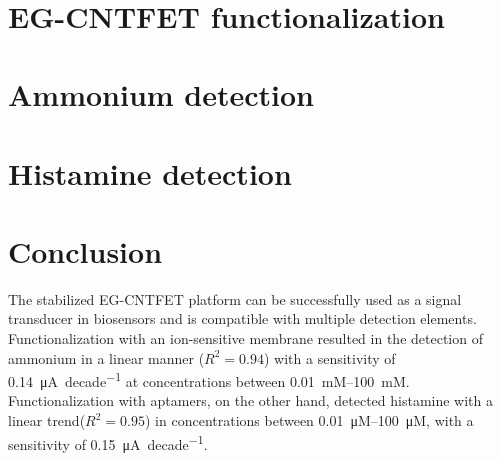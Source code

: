 \newpage
\thispagestyle{empty}
\ %
\newpage


\section{EG-CNTFET functionalization}
\label{sec:EGFETfunctionalization}




\section{Ammonium detection}
\label{sec:ammonium}




\section{Histamine detection}
\label{sec:histamine}




\section{Conclusion}

The stabilized EG-CNTFET platform can be successfully used as a signal transducer in biosensors and is compatible with multiple detection elements. Functionalization with an ion-sensitive membrane resulted in the detection of ammonium in a linear manner ($R^2=0.94$) with a sensitivity of \SI{0.14}{\uA \per decade} at concentrations between \SIrange{0.01}{100}{mM}.
Functionalization with aptamers, on the other hand, detected histamine with a linear trend($R^2=0.95$) in concentrations between \SIrange{0.01}{100}{\micro M}, with a sensitivity of \SI{0.15}{\uA \per decade}.

\newpage
\thispagestyle{empty}
\ %
\newpage